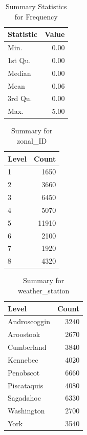 \begin{table}[ht]
\centering
\begin{tabular}{lr}
  \hline
Statistic & Value \\ 
  \hline
Min. & 0.00 \\ 
  1st Qu. & 0.00 \\ 
  Median & 0.00 \\ 
  Mean & 0.06 \\ 
  3rd Qu. & 0.00 \\ 
  Max. & 5.00 \\ 
   \hline
\end{tabular}
\caption{Summary Statistics for Frequency} 
\label{tab:freq_summary}
\end{table}
\begin{table}[ht]
\centering
\begin{tabular}{lr}
  \hline
Level & Count \\ 
  \hline
1 & 1650 \\ 
  2 & 3660 \\ 
  3 & 6450 \\ 
  4 & 5070 \\ 
  5 & 11910 \\ 
  6 & 2100 \\ 
  7 & 1920 \\ 
  8 & 4320 \\ 
   \hline
\end{tabular}
\caption{Summary for zonal_ID} 
\label{tab: zonal_ID}
\end{table}
\begin{table}[ht]
\centering
\begin{tabular}{lr}
  \hline
Level & Count \\ 
  \hline
Androscoggin & 3240 \\ 
  Aroostook & 2670 \\ 
  Cumberland & 3840 \\ 
  Kennebec & 4020 \\ 
  Penobscot & 6660 \\ 
  Piscataquis & 4080 \\ 
  Sagadahoc & 6330 \\ 
  Washington & 2700 \\ 
  York & 3540 \\ 
   \hline
\end{tabular}
\caption{Summary for weather_station} 
\label{tab: weather_station}
\end{table}
